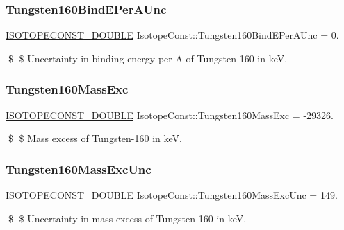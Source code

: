 \subsubsection{\texorpdfstring{Tungsten160\+Bind\+E\+Per\+A\+Unc}{Tungsten160BindEPerAUnc}}
{\footnotesize\ttfamily \mbox{\hyperlink{group___isotope_const-_macros_ga8f45a7272ce02c0b4c65c44636ed719a}{I\+S\+O\+T\+O\+P\+E\+C\+O\+N\+S\+T\+\_\+\+D\+O\+U\+B\+LE}} Isotope\+Const\+::\+Tungsten160\+Bind\+E\+Per\+A\+Unc = 0.}

\$ \$ Uncertainty in binding energy per A of Tungsten-\/160 in keV. \mbox{\label{group___isotope_const-_tungsten-_w160_ga4f326970acd4e19410e2e045a1742b62}} 
\subsubsection{\texorpdfstring{Tungsten160\+Mass\+Exc}{Tungsten160MassExc}}
{\footnotesize\ttfamily \mbox{\hyperlink{group___isotope_const-_macros_ga8f45a7272ce02c0b4c65c44636ed719a}{I\+S\+O\+T\+O\+P\+E\+C\+O\+N\+S\+T\+\_\+\+D\+O\+U\+B\+LE}} Isotope\+Const\+::\+Tungsten160\+Mass\+Exc = -\/29326.}

\$ \$ Mass excess of Tungsten-\/160 in keV. \mbox{\label{group___isotope_const-_tungsten-_w160_gaa5f086945a191810a8b905ed8b917466}} 
\subsubsection{\texorpdfstring{Tungsten160\+Mass\+Exc\+Unc}{Tungsten160MassExcUnc}}
{\footnotesize\ttfamily \mbox{\hyperlink{group___isotope_const-_macros_ga8f45a7272ce02c0b4c65c44636ed719a}{I\+S\+O\+T\+O\+P\+E\+C\+O\+N\+S\+T\+\_\+\+D\+O\+U\+B\+LE}} Isotope\+Const\+::\+Tungsten160\+Mass\+Exc\+Unc = 149.}

\$ \$ Uncertainty in mass excess of Tungsten-\/160 in keV. \mbox{\label{group___isotope_const-_tungsten-_w160_ga130f359105b9f5e168c7dc923e94a21b}} 
